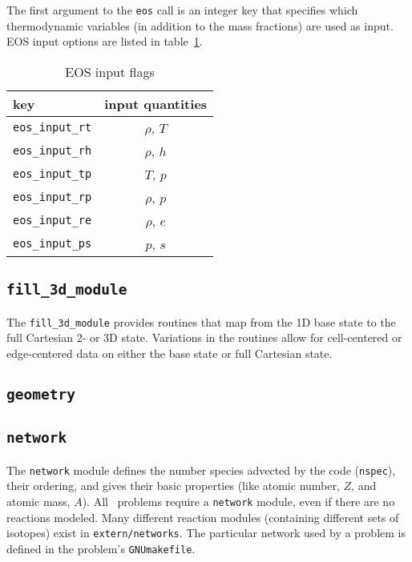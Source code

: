 The first argument to the {\tt eos} call is an integer key that
specifies which thermodynamic variables (in addition to the mass
fractions) are used as input.  EOS input options are listed 
in table~\ref{arch:table:eosinput}.

   \begin{table}[h]
   \caption{\label{arch:table:eosinput} EOS input flags}
   \begin{center}
   \begin{tabular}{lc}
   \hline
   key            & input quantities \\
   \hline
   {\tt eos\_input\_rt}       & $\rho$, $T$ \\
   {\tt eos\_input\_rh}       & $\rho$, $h$ \\
   {\tt eos\_input\_tp}       & $T$, $p$ \\
   {\tt eos\_input\_rp}       & $\rho$, $p$ \\
   {\tt eos\_input\_re}       & $\rho$, $e$ \\
   {\tt eos\_input\_ps}       & $p$, $s$ \\
   \hline
   \end{tabular}
   \end{center}
   \end{table}



\subsection{{\tt fill\_3d\_module}}

The {\tt fill\_3d\_module} provides routines that map from the 1D
base state to the full Cartesian 2- or 3D state.  Variations in the
routines allow for cell-centered or edge-centered data on either the
base state or full Cartesian state.

\subsection{{\tt geometry}}

\subsection{{\tt network}}

The {\tt network} module defines the number species advected by the
code ({\tt nspec}), their ordering, and gives their basic properties
(like atomic number, $Z$, and atomic mass, $A$).  All \maestro\ problems
require a {\tt network} module, even if there are no reactions
modeled.  Many different reaction modules (containing different sets
of isotopes) exist in {\tt extern/networks}.  The particular network
used by a problem is defined in the problem's {\tt GNUmakefile}.

